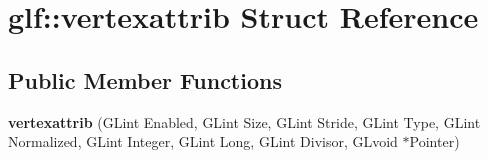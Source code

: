\hypertarget{structglf_1_1vertexattrib}{\section{glf\-:\-:vertexattrib Struct Reference}
\label{structglf_1_1vertexattrib}
}
\subsection*{Public Member Functions}
\begin{DoxyCompactItemize}
\item 
\hypertarget{structglf_1_1vertexattrib_a70a3e63729fa929fdb37419e164fe478}{{\bfseries vertexattrib} (G\-Lint Enabled, G\-Lint Size, G\-Lint Stride, G\-Lint Type, G\-Lint Normalized, G\-Lint Integer, G\-Lint Long, G\-Lint Divisor, G\-Lvoid $\ast$Pointer)}\label{structglf_1_1vertexattrib_a70a3e63729fa929fdb37419e164fe478}

\end{DoxyCompactItemize}
